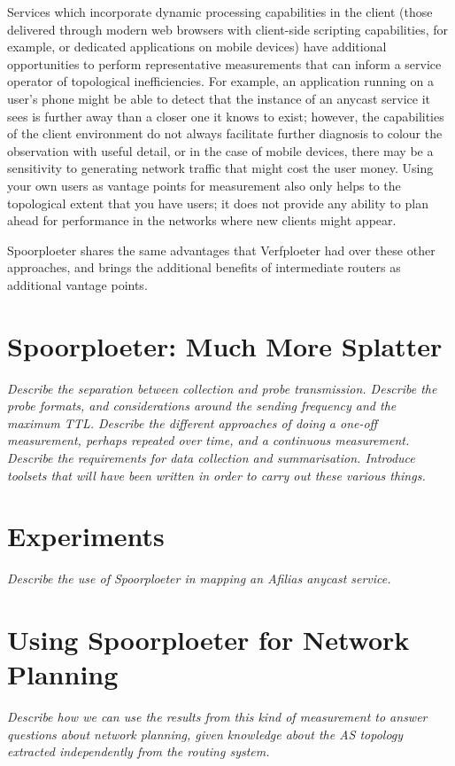 \documentclass[9pt,technote,letterpaper]{IEEEtran}
\begin{document}
Services which incorporate dynamic processing capabilities in the client (those delivered through modern web browsers with client-side scripting capabilities, for example, or dedicated applications on mobile devices) have additional opportunities to perform representative measurements that can inform a service operator of topological inefficiencies. For example, an application running on a user's phone might be able to detect that the instance of an anycast service it sees is further away than a closer one it knows to exist; however, the capabilities of the client environment do not always facilitate further diagnosis to colour the observation with useful detail, or in the case of mobile devices, there may be a sensitivity to generating network traffic that might cost the user money. Using your own users as vantage points for measurement also only helps to the topological extent that you have users; it does not provide any ability to plan ahead for performance in the networks where new clients might appear.

Spoorploeter shares the same advantages that Verfploeter had over these other approaches, and brings the additional benefits of intermediate routers as additional vantage points.

\section{Spoorploeter: Much More Splatter}
\emph{Describe the separation between collection and probe transmission. Describe the probe formats, and considerations around the sending frequency and the maximum TTL. Describe the different approaches of doing a one-off measurement, perhaps repeated over time, and a continuous measurement. Describe the requirements for data collection and summarisation. Introduce toolsets that will have been written in order to carry out these various things.}

\section{Experiments}
\emph{Describe the use of Spoorploeter in mapping an Afilias anycast service.}

\section{Using Spoorploeter for Network Planning}
\emph{Describe how we can use the results from this kind of measurement to answer questions about network planning, given knowledge about the AS topology extracted independently from the routing system.}



\end{document}
